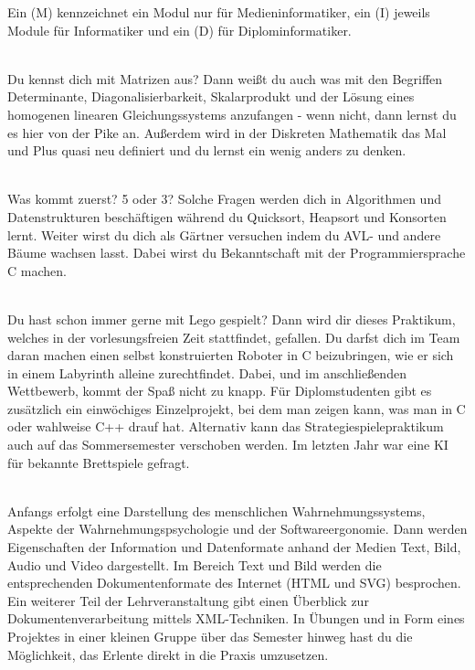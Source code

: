 
Ein (M) kennzeichnet ein Modul nur für Medieninformatiker, ein (I) jeweils Module für Informatiker und ein (D) für Diplominformatiker.


\textbf{}\\
Du kennst dich mit Matrizen aus?
Dann weißt du auch was mit den Begriffen Determinante, Diagonalisierbarkeit, Skalarprodukt und der Lösung eines homogenen linearen Gleichungssystems anzufangen - wenn nicht, dann lernst du es hier von der Pike an.
Außerdem wird in der Diskreten Mathematik das Mal und Plus quasi neu definiert und du lernst ein wenig anders zu denken.

\textbf{} \\
Was kommt zuerst?
5 oder 3?
Solche Fragen werden dich in Algorithmen und Datenstrukturen beschäftigen während du Quicksort, Heapsort und Konsorten lernt.
Weiter wirst du dich als Gärtner versuchen indem du AVL- und andere Bäume wachsen lasst.
Dabei wirst du Bekanntschaft mit der Programmiersprache C machen.

\textbf{} \\
Du hast schon immer gerne mit Lego gespielt?
Dann wird dir dieses Praktikum, welches in der vorlesungsfreien Zeit stattfindet, gefallen.
Du darfst dich im Team daran machen einen selbst konstruierten Roboter in C beizubringen, wie er sich in einem Labyrinth alleine zurechtfindet.
Dabei, und im anschließenden Wettbewerb, kommt der Spaß nicht zu knapp.
Für Diplomstudenten gibt es zusätzlich ein einwöchiges Einzelprojekt, bei dem man zeigen kann, was man in C oder wahlweise C++ drauf hat. Alternativ kann das Strategiespielepraktikum auch auf das Sommersemester verschoben werden.
Im letzten Jahr war eine KI für bekannte Brettspiele gefragt.

\textbf{} \\
Anfangs erfolgt eine Darstellung des menschlichen Wahrnehmungssystems, Aspekte der Wahrnehmungspsychologie und der Softwareergonomie.
Dann werden Eigenschaften der Information und Datenformate anhand der Medien Text, Bild, Audio und Video dargestellt.
Im Bereich Text und Bild werden die entsprechenden Dokumentenformate des Internet (HTML und SVG) besprochen.
Ein weiterer Teil der Lehrveranstaltung gibt einen Überblick zur Dokumentenverarbeitung mittels XML-Techniken.
In Übungen und in Form eines Projektes in einer kleinen Gruppe über das Semester hinweg hast du die Möglichkeit, das Erlente direkt in die Praxis umzusetzen.

